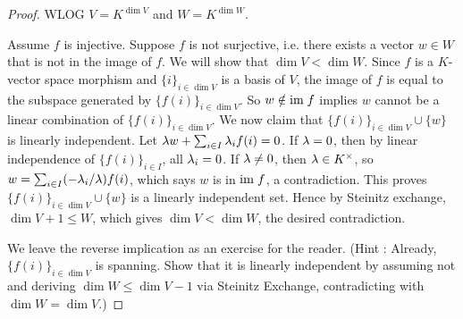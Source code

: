\documentclass[../book.tex]{subfiles}
\begin{document}
\begin{proof}
    WLOG $V = K^{\dim V}$ and $W = K^{\dim W}$. 

    Assume $f$ is injective. 
    Suppose $f$ is not surjective, i.e.
    there exists a vector $w \in W$ that is not in the image of $f$. 
    We will show that $\dim V < \dim W$. 
    Since $f$ is a $K$-vector space morphism and 
    $\{i\}_{i\in\dim V}$ is a basis of $V$, 
    the image of $f$ is equal to the subspace generated by $\{f(i)\}_{i\in\dim V}$.
    So $w \notin \textnormal{im}\; f$ implies 
    $w$ cannot be a linear combination of $\{f(i)\}_{i\in\dim V}$.
    We now claim that $\{f(i)\}_{i\in\dim V} \cup \{w\}$ is linearly independent. 
    Let $\lambda w + \sum_{i\in I} \lambda_i f(i) = 0$. 
    If $\lambda = 0$, then by linear independence of $\{f(i)\}_{i\in I}$, all $\lambda_i = 0$. If $\lambda \neq 0$, then $\lambda \in K^\times$,
    so $w = \sum_{i\in I} (-\lambda_i/\lambda)f(i)$, 
    which says $w$ is in $\textnormal{im}\; f$, a contradiction. 
    This proves $\{f(i)\}_{i\in\dim V} \cup \{w\}$ is a linearly independent set.
    Hence by Steinitz exchange, $\dim V + 1 \leq W$,
    which gives $\dim V < \dim W$, the desired contradiction. 
    
    We leave the reverse implication as an exercise for the reader. 
    (Hint : Already, $\{f(i)\}_{i\in\dim V}$ is spanning. 
    Show that it is linearly independent by assuming not and 
    deriving $\dim W \leq \dim V - 1$ via Steinitz Exchange, 
    contradicting with $\dim W = \dim V$.)
\end{proof}
\end{document}
